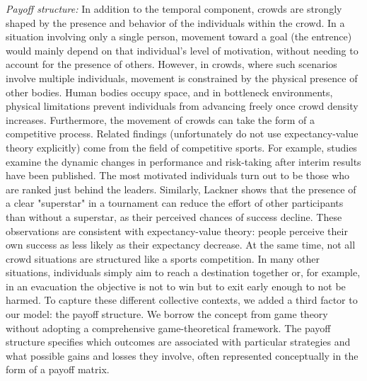 \documentclass[pdflatex,sn-mathphys-num]{sn-jnl}%
\theoremstyle{thmstyleone}%
\theoremstyle{thmstyletwo}%
\theoremstyle{thmstylethree}%
\begin{document}
\textit{Payoff structure:} In addition to the temporal component, crowds are strongly shaped by the presence and behavior of the individuals within the crowd. In a situation involving only a single person, movement toward a goal (the entrence) would mainly depend on that individual's level of motivation, without needing to account for the presence of others. However, in crowds, where such scenarios involve multiple individuals, movement is constrained by the physical presence of other bodies. Human bodies occupy space, and in bottleneck environments, physical limitations prevent individuals from advancing freely once crowd density increases. Furthermore, the movement of crowds can take the form of a competitive process. Related findings (unfortunately do not use expectancy-value theory explicitly) come from the field of competitive sports. For example, studies examine the dynamic changes in performance and risk-taking after interim results have been published. The most motivated individuals turn out to be those who are ranked just behind the leaders. Similarly, Lackner \cite{lackner_effort_2023} shows that the presence of a clear "superstar" in a tournament can reduce the effort of other participants than without a superstar, as their perceived chances of success decline.  These observations are consistent with expectancy-value theory: people perceive their own success as less likely as their expectancy decrease. At the same time, not all crowd situations are structured like a sports competition. In many other situations, individuals simply aim to reach a destination together or, for example, in an evacuation the objective is not to win but to exit early enough to not be harmed. To capture these different collective contexts, we added a third factor to our model: the payoff structure. We borrow the concept from game theory without adopting a comprehensive game-theoretical framework. The payoff structure specifies which outcomes are associated with particular strategies and what possible gains and losses they involve, often represented conceptually in the form of a payoff matrix. 
\end{document}
